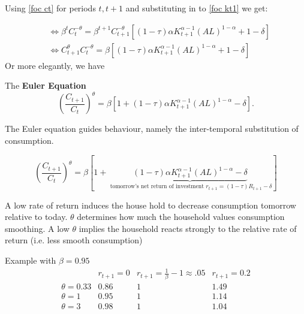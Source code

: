 \documentclass[11pt]{article}
\begin{document}
Using \eqref{foc ct} for periods $t, t+1$ and substituting in to \eqref{foc kt1} we get:

\begin{equation*}
\begin{aligned}
& \Leftrightarrow \beta^t C_t^{-\theta}=\beta^{t+1} C_{t+1}^{-\theta}\left[(1-\tau) \alpha K_{t+1}^{\alpha-1}(A L)^{1-\alpha}+1-\delta\right] \\
& \Leftrightarrow C_{t+1}^\theta C_t^{-\theta}=\beta\left[(1-\tau) \alpha K_{t+1}^{\alpha-1}(A L)^{1-\alpha}+1-\delta\right]
\end{aligned}
\end{equation*}
Or more elegantly, we have

\begin{shaded}
The \textbf{Euler Equation}
    \begin{equation}
    \label{euler}
\left(\frac{C_{t+1}}{C_t}\right)^\theta=\beta\left[1+(1-\tau) \alpha K_{t+1}^{\alpha-1}(A L)^{1-\alpha}-\delta\right] .
\end{equation}

The Euler equation guides behaviour, namely the inter-temporal substitution of consumption. 
\begin{intu}
\[\left(\frac{C_{t+1}}{C_t}\right)^\theta=\beta\left[1+\underbrace{(1-\tau) \alpha K_{t+1}^{\alpha-1}(A L)^{1-\alpha}-\delta}_{\text { tomorrow's net return of investment } r_{t+1} = (1-\tau)R_{t+1} - \delta}\right] \]

A low rate of return induces the house hold to decrease consumption tomorrow relative to today. $\theta$ determines how much the household values consumption smoothing. A low $\theta$ implies the household reacts strongly to the relative rate of return (i.e. less smooth consumption)




\end{intu}

\end{shaded}

Example with $\beta = 0.95$
\begin{equation}
\begin{array}{c|c|c|c} 
& r_{t+1}=0 & r_{t+1}=\frac{1}{\beta}-1 \approx .05 & r_{t+1}=0.2 \\
\hline \theta=0.33 & 0.86 & 1 & 1.49 \\
\theta=1 & 0.95 & 1 & 1.14 \\
\theta=3 & 0.98 & 1 & 1.04
\end{array}
\end{equation}
\end{document}
